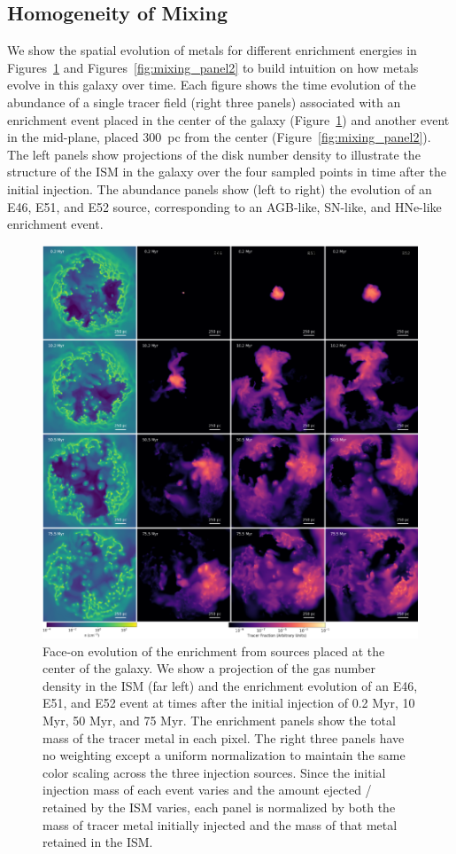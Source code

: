 \documentclass[twocolumn]{aastex62}
\begin{document}
\subsection{Homogeneity of Mixing}
\label{sec:spreads}

We show the spatial evolution of metals for different enrichment energies in Figures~\ref{fig:mixing_panel} and Figures~\ref{fig:mixing_panel2} to build intuition on how metals evolve in this galaxy over time. Each figure shows the time evolution of the abundance of a single tracer field (right three panels) associated with an enrichment event placed in the center of the galaxy (Figure~\ref{fig:mixing_panel}) and another event in the mid-plane, placed 300~pc from the center (Figure~\ref{fig:mixing_panel2}). The left panels show projections of the disk number density to illustrate the structure of the ISM in the galaxy over the four sampled points in time after the initial injection. The abundance panels show (left to right) the evolution of an E46, E51, and E52 source, corresponding to an AGB-like, SN-like, and HNe-like enrichment event.

\begin{figure}
\centering

\includegraphics[width=0.9\linewidth]{mixing_test_center.png}
\caption{Face-on evolution of the enrichment from sources placed at the center of the galaxy. We show a projection of the gas number density in the ISM (far left) and the enrichment evolution of an E46, E51, and E52 event at times after the initial injection of 0.2 Myr, 10 Myr, 50 Myr, and 75 Myr. The enrichment panels show the total mass of the tracer metal in each pixel. The right three panels have no weighting except a uniform normalization to maintain the same color scaling across the three injection sources. Since the initial injection mass of each event varies and the amount ejected / retained by the ISM varies, each panel is normalized by both the mass of tracer metal initially injected and the mass of that metal retained in the ISM.}
\label{fig:mixing_panel}
\end{figure}
\end{document}
